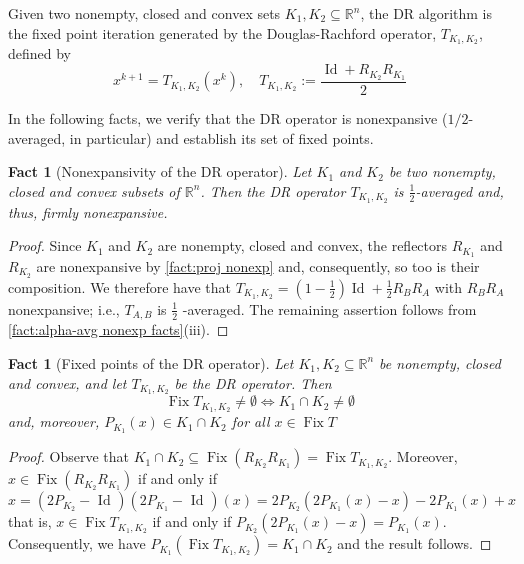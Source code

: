 \documentclass[smallextended,numbook,nospthms]{svjour3}
\theoremstyle{plain}
\newtheorem{fact}[theorem]{Fact}
\theoremstyle{definition}
\def\RR{\mathds R}
\DeclareMathOperator{\Id}{Id}
\begin{document}
Given two nonempty, closed and convex sets $K_1, K_2 \subseteq \RR^n$, the DR algorithm is the fixed point iteration generated by the Douglas-Rachford operator, $T_{K_1, K_2}$, defined by
\[
x^{k+1}=T_{K_1, K_2}\left(x^{k}\right), \quad T_{K_1, K_2}:=\frac{\Id+R_{K_2} R_{K_1}}{2} \label{eq:DRM}
\]

In the following facts, we verify that the DR operator is nonexpansive ($1/2$-averaged, in particular) and establish its set of fixed points.
\begin{fact}[Nonexpansivity of the DR operator]\label{fact:DR nonexp}
Let $K_1$ and $K_{2}$ be two nonempty, closed and convex subsets of $\RR^n$. Then the DR operator $T_{K_1, K_2}$ is $\frac{1}{2}$-averaged and, thus, firmly nonexpansive.
\end{fact}
\begin{proof}
Since $K_1$ and $K_2$ are nonempty, closed and convex, the reflectors $R_{K_1}$ and $R_{K_2}$ are nonexpansive by \cref{fact:proj nonexp} and, consequently, so too is their composition. We therefore have that $T_{K_1, K_2}=\left(1-\frac{1}{2}\right) \Id+\frac{1}{2} R_{B} R_{A}$ with $R_{B} R_{A}$ nonexpansive; i.e., $T_{A, B}$ is $\frac{1}{2}$ -averaged. The remaining assertion follows from \cref{fact:alpha-avg nonexp facts}(iii).
\end{proof}

\begin{fact}[Fixed points of the DR operator]\label{fact:DR Fix}
Let $K_1, K_2 \subseteq \RR^n$ be nonempty, closed and convex, and let $T_{K_1, K_2}$ be the DR operator. Then
\[
\operatorname{Fix} T_{K_1, K_2} \neq \emptyset \Longleftrightarrow K_1 \cap K_2 \neq \emptyset
\]
and, moreover, $P_{K_1}(x) \in K_1 \cap K_2$ for all $x \in \operatorname{Fix} T$
\end{fact}
\begin{proof}
Observe that $K_1 \cap K_2 \subseteq \operatorname{Fix}\left(R_{K_2} R_{K_1}\right)=\operatorname{Fix} T_{K_1, K_2}$. Moreover, $x \in \operatorname{Fix}\left(R_{K_2} R_{K_1}\right)$ if and only if
\[
x=\left(2 P_{K_2}-\text { Id }\right)\left(2 P_{K_1}-\text { Id }\right)(x)=2 P_{K_2}\left(2 P_{K_1}(x)-x\right)-2 P_{K_1}(x)+x
\]
that is, $x \in \operatorname{Fix} T_{K_1, K_2}$ if and only if $P_{K_2}\left(2 P_{K_1}(x)-x\right)=P_{K_1}(x)$. Consequently, we have $P_{K_1}\left(\operatorname{Fix} T_{K_1, K_2}\right)=K_1 \cap K_2$ and the result follows.
\end{proof}
\end{document}
